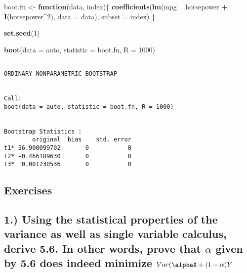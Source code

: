 \documentclass[12pt,]{report}
\newenvironment{Shaded}{\begin{snugshade}}{\end{snugshade}}
\newcommand{\ControlFlowTok}[1]{\textcolor[rgb]{0.13,0.29,0.53}{\textbf{#1}}}
\newcommand{\DataTypeTok}[1]{\textcolor[rgb]{0.13,0.29,0.53}{#1}}
\newcommand{\DecValTok}[1]{\textcolor[rgb]{0.00,0.00,0.81}{#1}}
\newcommand{\KeywordTok}[1]{\textcolor[rgb]{0.13,0.29,0.53}{\textbf{#1}}}
\newcommand{\NormalTok}[1]{#1}
\newcommand{\OperatorTok}[1]{\textcolor[rgb]{0.81,0.36,0.00}{\textbf{#1}}}
\newcommand{\StringTok}[1]{\textcolor[rgb]{0.31,0.60,0.02}{#1}}
\begin{document}
\begin{Shaded}
\begin{Highlighting}[]
\NormalTok{boot.fn <-}\StringTok{ }\ControlFlowTok{function}\NormalTok{(data, index)\{}
   \KeywordTok{coefficients}\NormalTok{(}\KeywordTok{lm}\NormalTok{(mpg }\OperatorTok{~}\StringTok{ }\NormalTok{horsepower }\OperatorTok{+}\StringTok{ }\KeywordTok{I}\NormalTok{(horsepower}\OperatorTok{^}\DecValTok{2}\NormalTok{), }\DataTypeTok{data =}\NormalTok{ data), }\DataTypeTok{subset =}\NormalTok{ index)}
\NormalTok{\}}

\KeywordTok{set.seed}\NormalTok{(}\DecValTok{1}\NormalTok{)}

\KeywordTok{boot}\NormalTok{(}\DataTypeTok{data =}\NormalTok{ auto, }\DataTypeTok{statistic =}\NormalTok{ boot.fn, }\DataTypeTok{R =} \DecValTok{1000}\NormalTok{)}
\end{Highlighting}
\end{Shaded}

\begin{verbatim}

ORDINARY NONPARAMETRIC BOOTSTRAP


Call:
boot(data = auto, statistic = boot.fn, R = 1000)


Bootstrap Statistics :
        original  bias    std. error
t1* 56.900099702       0           0
t2* -0.466189630       0           0
t3*  0.001230536       0           0
\end{verbatim}

\hypertarget{exercises}{%
\subsection{Exercises}\label{exercises}}

\hypertarget{using-the-statistical-properties-of-the-variance-as-well-as-single-variable-calculus-derive-5.6.-in-other-words-prove-that-alpha-given-by-5.6-does-indeed-minimize-varalphax-1---alphay}{%
\subsection{\texorpdfstring{1.) Using the statistical properties of the
variance as well as single variable calculus, derive 5.6. In other
words, prove that \(\alpha\) given by 5.6 does indeed minimize
\(Var(\alphaX + (1 - \alpha)Y\)}{1.) Using the statistical properties of the variance as well as single variable calculus, derive 5.6. In other words, prove that \textbackslash{}alpha given by 5.6 does indeed minimize Var(\textbackslash{}alphaX + (1 - \textbackslash{}alpha)Y}}\label{using-the-statistical-properties-of-the-variance-as-well-as-single-variable-calculus-derive-5.6.-in-other-words-prove-that-alpha-given-by-5.6-does-indeed-minimize-varalphax-1---alphay}}
\end{document}
